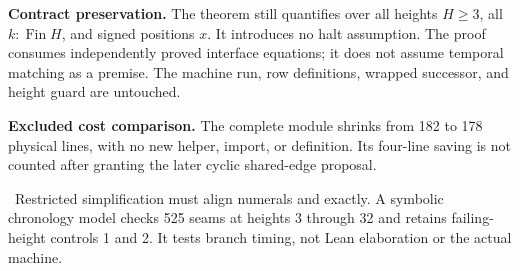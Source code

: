 \textbf{Contract preservation.} The theorem still quantifies over all heights $H\ge3$, all $k:\operatorname{Fin}H$, and signed positions $x$. It introduces no halt assumption. The proof consumes independently proved interface equations; it does not assume temporal matching as a premise. The machine run, row definitions, wrapped successor, and height guard are untouched.

\textbf{Excluded cost comparison.} The complete module shrinks from 182 to 178 physical lines, with no new helper, import, or definition. Its four-line saving is not counted after granting the later cyclic shared-edge proposal.

\risk\ Restricted simplification must align numerals and  exactly. A symbolic chronology model checks 525 seams at heights 3 through 32 and retains failing-height controls 1 and 2. It tests branch timing, not Lean elaboration or the actual machine. \status
